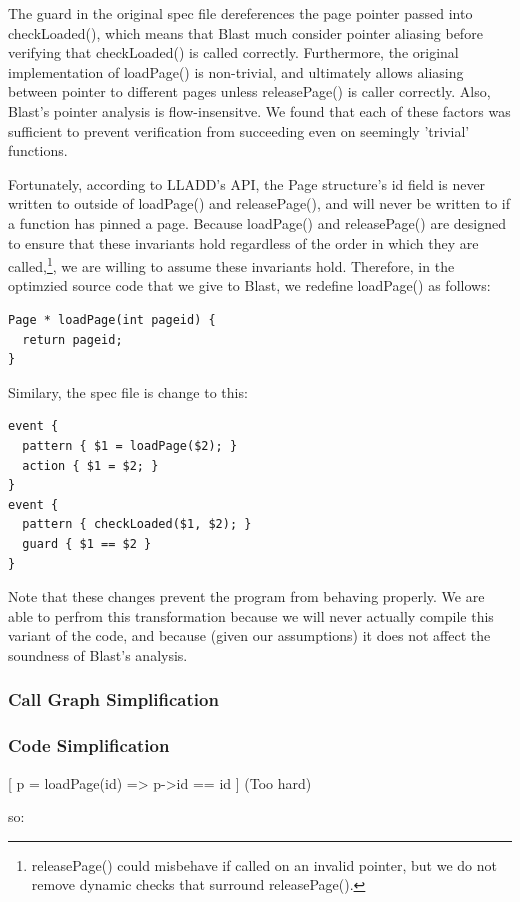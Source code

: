 \documentclass[10pt,letterpaper,twocolumn,english]{article}
\newcommand{\yad}{LLADD\xspace}
\newcommand{\pin}{loadPage()\xspace}
\newcommand{\unpin}{releasePage()\xspace}
\newcommand{\checkpage}{checkLoaded()\xspace}
\begin{document}
The guard in the original spec file dereferences the page pointer
passed into \checkpage, which means that Blast much consider pointer
aliasing before verifying that \checkpage is called correctly.
Furthermore, the original implementation of \pin is non-trivial, and
ultimately allows aliasing between pointer to different pages unless
\unpin is caller correctly.  Also, Blast's pointer analysis is
flow-insensitve.  We found that each of these factors was sufficient
to prevent verification from succeeding even on seemingly 'trivial'
functions.  

Fortunately, according to \yad's API, the Page structure's id field is
never written to outside of \pin and \unpin, and will never be written
to if a function has pinned a page.  Because \pin and \unpin are
designed to ensure that these invariants hold regardless of the order
in which they are called,\footnote{\unpin could misbehave if called on
an invalid pointer, but we do not remove dynamic checks that surround
\unpin.}, we are willing to assume these invariants hold.  Therefore,
in the optimzied source code that we give to Blast, we redefine
\pin as follows:

\begin{verbatim}
Page * loadPage(int pageid) {
  return pageid;
}
\end{verbatim}
Similary, the spec file is change to this:
\begin{verbatim}
event { 
  pattern { $1 = loadPage($2); }
  action { $1 = $2; }
}
event { 
  pattern { checkLoaded($1, $2); }  
  guard { $1 == $2 }
}
\end{verbatim}

Note that these changes prevent the program from behaving properly.
We are able to perfrom this transformation because we will never
actually compile this variant of the code, and because (given our
assumptions) it does not affect the soundness of Blast's analysis.  

\subsubsection{Call Graph Simplification}

\subsubsection{Code Simplification}

[ p = loadPage(id) => p->id == id ]  (Too hard)

so:
\end{document}

